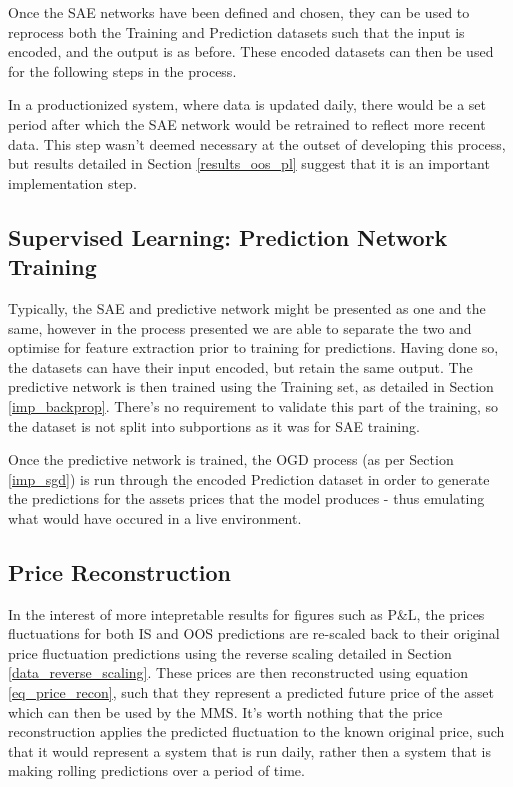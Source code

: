 \documentclass[a4paper,11pt,oneside]{article}
\theoremstyle{plain}
\theoremstyle{definition}
\begin{document}
	Once the SAE networks have been defined and chosen, they can be used to reprocess both the Training and Prediction datasets such that the input is encoded, and the output is as before. These encoded datasets can then be used for the following steps in the process. \newline
	
	In a productionized system, where data is updated daily, there would be a set period after which the SAE network would be retrained to reflect more recent data. This step wasn't deemed necessary at the outset of developing this process, but results detailed in Section \ref{results_oos_pl} suggest that it is an important implementation step.\newline
	
	\subsection{Supervised Learning: Prediction Network Training}\label{proc_predictionnetwork}
	
	Typically, the SAE and predictive network might be presented as one and the same, however in the process presented we are able to separate the two and optimise for feature extraction prior to training for predictions. Having done so, the datasets can have their input encoded, but retain the same output. The predictive network is then trained using the Training set, as detailed in Section \ref{imp_backprop}. There's no requirement to validate this part of the training, so the dataset is not split into subportions as it was for SAE training. \newline
	
	Once the predictive network is trained, the OGD process (as per Section \ref{imp_sgd}) is run through the encoded Prediction dataset in order to generate the predictions for the assets prices that the model produces - thus emulating what would have occured in a live environment. \newline
	
	\subsection{Price Reconstruction}\label{proc_precerecon}
	
	In the interest of more intepretable results for figures such as P\&L, the prices fluctuations for both IS and OOS predictions are re-scaled back to their original price fluctuation predictions using the reverse scaling detailed in Section \ref{data_reverse_scaling}. These prices are then reconstructed using equation \eqref{eq_price_recon}, such that they represent a predicted future price of the asset which can then be used by the MMS. It's worth nothing that the price reconstruction applies the predicted fluctuation to the known original price, such that it would represent a system that is run daily, rather then a system that is making rolling predictions over a period of time. 
	
\end{document}
